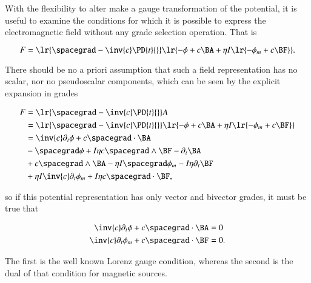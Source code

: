 %
%
With the flexibility to alter make a gauge transformation of the potential, it is useful to examine the conditions for which it is possible to express the electromagnetic field without any grade selection operation.
That is

\begin{dmath}\label{eqn:potentialSection_LorenzGauge:1720}
F
=
\lr{ \spacegrad - \inv{c} \PD{t}{} }
\lr{
      - \phi
      + c \BA
      + \eta I \lr{ -\phi_m + c \BF }
}.
\end{dmath}

There should be no a priori assumption that such a field representation has no scalar, nor no pseudoscalar components, which can be seen by the explicit expansion in grades

\begin{dmath}\label{eqn:potentialSection_LorenzGauge:1640}
\begin{aligned}
F
&=
\lr{ \spacegrad - \inv{c} \PD{t}{} } A \\
&=
\lr{ \spacegrad - \inv{c} \PD{t}{} } \lr{ -\phi + c \BA + \eta I \lr{ -\phi_m + c \BF } } \\
&=
\inv{c} \partial_t \phi
+ c \spacegrad \cdot \BA  \\
&-\spacegrad \phi
+ I \eta c \spacegrad \wedge \BF
- \partial_t \BA  \\
&+ c \spacegrad \wedge \BA
- \eta I \spacegrad \phi_m
- I \eta \partial_t \BF \\
&+ \eta I \inv{c} \partial_t \phi_m
+ I \eta c \spacegrad \cdot \BF,
\end{aligned}
\end{dmath}

so if this potential representation has only vector and bivector grades, it must be true that

\begin{dmath}\label{eqn:potentialSection_LorenzGauge:1660}
\begin{aligned}
\inv{c} \partial_t \phi + c \spacegrad \cdot \BA &= 0 \\
\inv{c} \partial_t \phi_m + c \spacegrad \cdot \BF &= 0.
\end{aligned}
\end{dmath}

The first is the well known Lorenz gauge condition, whereas the second is the dual of that condition for magnetic sources.

